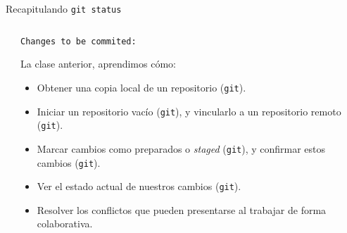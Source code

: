 \begin{frame}[t]{Recapitulando}
    \pause
    \texttt{git status}
    \vspace{.4em}

    \begin{columns}[t]
        \begin{column}{0.05\textwidth}

        \end{column}
        \begin{column}{0.90\textwidth}
            \pause
            \hspace{-.25em}\texttt{Changes to be commited:}

            \pause
            \begin{block}{La clase anterior, aprendimos cómo:}
                \begin{itemize}
                    \pause
                    \item Obtener una copia local de un repositorio (\texttt{git}).
                    \pause\pause
                    \item Iniciar un repositorio vacío (\texttt{git}), \pause\pause
                    y vincularlo a un repositorio remoto (\texttt{git}).
                    \pause\pause
                    \item Marcar cambios como preparados o \textit{staged} (\texttt{git}),
                    \pause\pause y confirmar estos cambios (\texttt{git}).
                    \pause\pause
                    \item Ver el estado actual de nuestros cambios (\texttt{git}).
                    \pause\pause
                    \item Resolver los conflictos que pueden presentarse al trabajar de forma colaborativa.
                \end{itemize}
            \end{block}

        \end{column}
        \begin{column}{0.05\textwidth}

        \end{column}
    \end{columns}

\end{frame}

